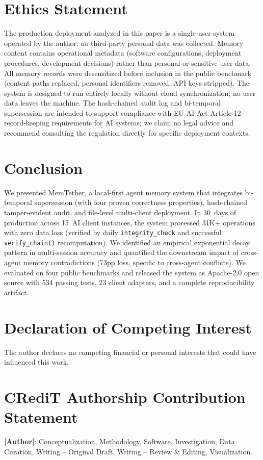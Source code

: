 \documentclass[11pt]{article}
\begin{document}
\section*{Ethics Statement}
The production deployment analyzed in this paper is a single-user system operated by the author; no third-party personal data was collected. Memory content contains operational metadata (software configurations, deployment procedures, development decisions) rather than personal or sensitive user data. All memory records were desensitized before inclusion in the public benchmark (content paths replaced, personal identifiers removed, API keys stripped). The system is designed to run entirely locally without cloud synchronization; no user data leaves the machine. The hash-chained audit log and bi-temporal supersession are intended to support compliance with EU AI Act Article 12 record-keeping requirements for AI systems; we claim no legal advice and recommend consulting the regulation directly for specific deployment contexts.

\section{Conclusion}

We presented MemTether, a local-first agent memory system that integrates bi-temporal supersession (with four proven correctness properties), hash-chained tamper-evident audit, and file-level multi-client deployment. In 30~days of production across 15~AI client instances, the system processed 31K+ operations with zero data loss (verified by daily \texttt{integrity\_check} and successful \texttt{verify\_chain()} recomputation). We identified an empirical exponential decay pattern in multi-session accuracy and quantified the downstream impact of cross-agent memory contradictions (73pp loss, specific to cross-agent conflicts). We evaluated on four public benchmarks and released the system as Apache-2.0 open source with 534 passing tests, 23 client adapters, and a complete reproducibility artifact.



\section*{Declaration of Competing Interest}
The author declares no competing financial or personal interests that could have influenced this work.

\section*{CRediT Authorship Contribution Statement}
\textbf{[Author]}: Conceptualization, Methodology, Software, Investigation, Data Curation, Writing -- Original Draft, Writing -- Review \& Editing, Visualization.
\end{document}
